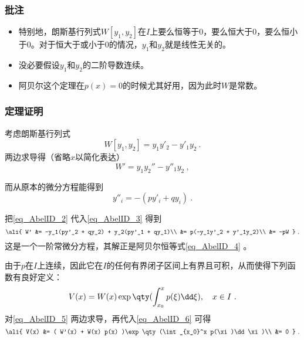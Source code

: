 \subsubsection{批注}

\begin{itemize}
\item 特别地，朗斯基行列式$W[y_1, y_2]$在$I$上要么恒等于$0$，要么恒大于$0$，要么恒小于$0$。对于恒大于或小于$0$的情况，$y_1$和$y_2$就是线性无关的。
\item 没必要假设$y_1$和$y_2$的二阶导数连续。
\item 阿贝尔这个定理在$p(x)=0$的时候尤其好用，因为此时$W$是常数。
\end{itemize}


\subsubsection{定理证明}

考虑朗斯基行列式
\begin{equation}
W[y_1, y_2] = y_1y'_2 - y'_1y_2~.
\end{equation}
两边求导得（省略$x$以简化表达）
\begin{equation}\label{eq_AbelID_3}
W' = y_1y_2'' - y''_1y_2~,
\end{equation}

而从原本的微分方程能得到
\begin{equation}\label{eq_AbelID_2}
y''_i = -(py'_i+qy_i)~.
\end{equation}

把\autoref{eq_AbelID_2} 代入\autoref{eq_AbelID_3} 得到
\begin{equation}\label{eq_AbelID_6}
\ali{
    W' &= -y_1(py'_2 + qy_2) + y_2(py'_1 + qy_1)\\
    &= p(-y_1y'_2 + y'_1y_2)\\
    &= -pW
}~.
\end{equation}
这是一个一阶常微分方程，其解正是阿贝尔恒等式\autoref{eq_AbelID_4} 。

由于$p$在$I$上连续，因此它在$I$的任何有界闭子区间上有界且可积，从而使得下列函数有良好定义：
\begin{equation}\label{eq_AbelID_5}
V(x) = W(x) \exp\qty(\int_{x_0}^x p(\xi)\dd \xi),\quad x\in I~.
\end{equation}
对\autoref{eq_AbelID_5} 两边求导，再代入\autoref{eq_AbelID_6} 可得
\begin{equation}
\ali{
    V(x) &= ( W'(x) + W(x) p(x) )\exp\qty(\int_{x_0}^x p(\xi)\dd \xi)\\
    &= 0
}~.
\end{equation}

